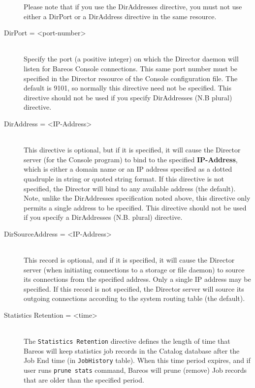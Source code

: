 \begin{description}
Please note that if you use the DirAddresses directive, you must
not use either a DirPort or a DirAddress directive in the same
resource.

\item [DirPort = {\textless}port-number{\textgreater}] \hfill \\
Specify the port (a positive  integer) on which the  Director daemon will
listen for Bareos Console connections.  This same port number must be
specified in the Director resource  of the Console configuration file. The
default is 9101, so  normally this directive need not be specified.  This
directive should not be used if you specify DirAddresses (N.B plural)
directive.

\item [DirAddress = {\textless}IP-Address{\textgreater}] \hfill \\
This directive is optional, but if it is specified, it will cause the
Director server (for the Console program) to bind to the specified
{\bf IP-Address}, which is either a domain name or an IP address specified as a
dotted quadruple in string or quoted string format.  If this directive is
not specified, the Director will bind to any available address (the
default).  Note, unlike the DirAddresses specification noted above, this
directive only permits a single address to be specified.  This directive
should not be used if you specify a DirAddresses (N.B. plural) directive.

\item [DirSourceAddress = {\textless}IP-Address{\textgreater}] \hfill \\
This record is optional, and if it is specified, it will cause the Director
server (when initiating connections to a storage or file daemon) to source
its connections from the specified address.  Only a single IP address may be
specified.  If this record is not specified, the Director server will source
its outgoing connections according to the system routing table (the default).

\item [Statistics Retention = {\textless}time{\textgreater}] \hfill \\
\label{PruneStatistics}
The \texttt{Statistics Retention} directive defines the length of time that
Bareos will keep statistics job records in the Catalog database after the
Job End time (in \texttt{JobHistory} table). When this time period expires,
and if user runs \texttt{prune stats} command, Bareos will prune (remove)
Job records that are older than the specified period.


\end{description}
